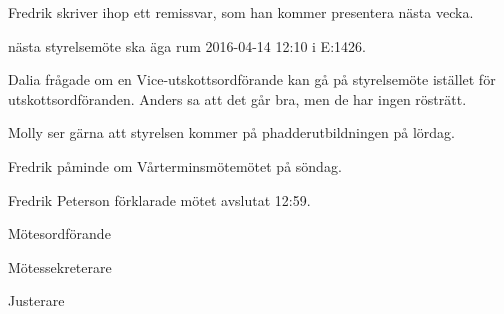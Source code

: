 \documentclass[10pt]{article}
\def\mo{Fredrik Peterson}
\def\ms{Erik Månsson}
\def\ji{Anders Nilsson}
\begin{document}
\begin{paragrafer}
Fredrik skriver ihop ett remissvar, som han kommer presentera nästa vecka.

\Mba nästa styrelsemöte ska äga rum 2016-04-14 12:10 i E:1426.

\Ibfu

Dalia frågade om en Vice-utskottsordförande kan gå på styrelsemöte istället för utskottsordföranden. Anders sa att det går bra, men de har ingen rösträtt.

Molly ser gärna att styrelsen kommer på phadderutbildningen på lördag.

Fredrik påminde om Vårterminsmötemötet på söndag.

{\mo} förklarade mötet avslutat 12:59.

\end{paragrafer}

\hidesignfoot
\begin{signatures}{3}
\signature{\mo}{Mötesordförande}
\signature{\ms}{Mötessekreterare}
\signature{\ji}{Justerare}
\end{signatures}
\end{document}
